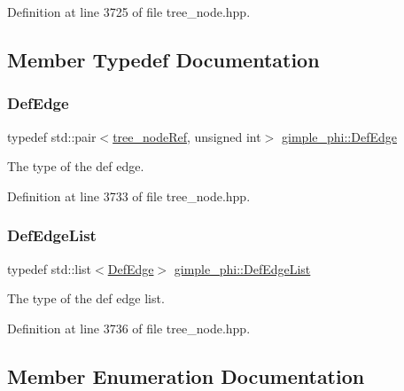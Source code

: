 Definition at line 3725 of file tree\+\_\+node.\+hpp.



\subsection{Member Typedef Documentation}
\mbox{\label{structgimple__phi_a019724c668ca2269a031adfa47fbec7b}} 
\subsubsection{\texorpdfstring{Def\+Edge}{DefEdge}}
{\footnotesize\ttfamily typedef std\+::pair$<$\hyperlink{tree__node_8hpp_a6ee377554d1c4871ad66a337eaa67fd5}{tree\+\_\+node\+Ref}, unsigned int$>$ \hyperlink{structgimple__phi_a019724c668ca2269a031adfa47fbec7b}{gimple\+\_\+phi\+::\+Def\+Edge}}



The type of the def edge. 



Definition at line 3733 of file tree\+\_\+node.\+hpp.

\mbox{\label{structgimple__phi_abaf4e51c9be92bf7efbf5aaaab82f386}} 
\subsubsection{\texorpdfstring{Def\+Edge\+List}{DefEdgeList}}
{\footnotesize\ttfamily typedef std\+::list$<$\hyperlink{structgimple__phi_a019724c668ca2269a031adfa47fbec7b}{Def\+Edge}$>$ \hyperlink{structgimple__phi_abaf4e51c9be92bf7efbf5aaaab82f386}{gimple\+\_\+phi\+::\+Def\+Edge\+List}}



The type of the def edge list. 



Definition at line 3736 of file tree\+\_\+node.\+hpp.



\subsection{Member Enumeration Documentation}
\mbox{\label{structgimple__phi_a372f157945dd4358f30d58eda2f09ac9}} 
